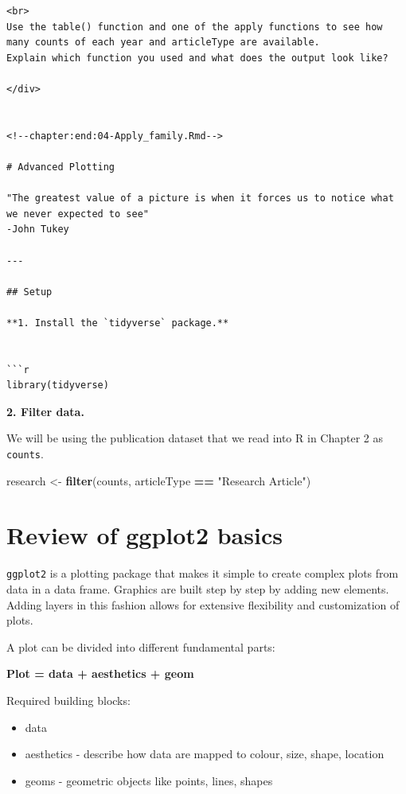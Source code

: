 \documentclass[
]{book}
\newenvironment{Shaded}{\begin{snugshade}}{\end{snugshade}}
\newcommand{\KeywordTok}[1]{\textcolor[rgb]{0.13,0.29,0.53}{\textbf{#1}}}
\newcommand{\NormalTok}[1]{#1}
\newcommand{\OperatorTok}[1]{\textcolor[rgb]{0.81,0.36,0.00}{\textbf{#1}}}
\newcommand{\StringTok}[1]{\textcolor[rgb]{0.31,0.60,0.02}{#1}}
\providecommand{\tightlist}{%
  \setlength{\itemsep}{0pt}\setlength{\parskip}{0pt}}
\begin{document}
\begin{verbatim}
<br>
Use the table() function and one of the apply functions to see how many counts of each year and articleType are available. 
Explain which function you used and what does the output look like?

</div>


<!--chapter:end:04-Apply_family.Rmd-->

# Advanced Plotting 

"The greatest value of a picture is when it forces us to notice what we never expected to see"
-John Tukey

---

## Setup

**1. Install the `tidyverse` package.**


```r
library(tidyverse)
\end{verbatim}

\textbf{2. Filter data.}

We will be using the publication dataset that we read into R in Chapter 2 as \texttt{counts}.

\begin{Shaded}
\begin{Highlighting}[]
\NormalTok{research <-}\StringTok{ }\KeywordTok{filter}\NormalTok{(counts, articleType }\OperatorTok{==}\StringTok{ "Research Article"}\NormalTok{)}
\end{Highlighting}
\end{Shaded}

\hypertarget{review-of-ggplot2-basics}{%
\section{Review of ggplot2 basics}\label{review-of-ggplot2-basics}}

\texttt{ggplot2} is a plotting package that makes it simple to create complex plots from data in a data frame. Graphics are built step by step by adding new elements. Adding layers in this fashion allows for extensive flexibility and customization of plots.

A plot can be divided into different fundamental parts:

\textbf{Plot = data + aesthetics + geom}

Required building blocks:

\begin{itemize}
\tightlist
\item
  data
\item
  aesthetics - describe how data are mapped to colour, size, shape, location
\item
  geoms - geometric objects like points, lines, shapes
\end{itemize}
\end{document}
